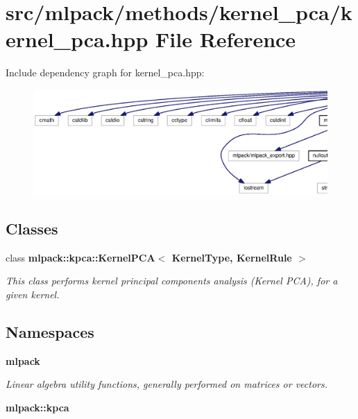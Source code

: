 \section{src/mlpack/methods/kernel\+\_\+pca/kernel\+\_\+pca.hpp File Reference}
\label{kernel__pca_8hpp}
Include dependency graph for kernel\+\_\+pca.\+hpp\+:
\nopagebreak
\begin{figure}[H]
\begin{center}
\leavevmode
\includegraphics[width=350pt]{kernel__pca_8hpp__incl}
\end{center}
\end{figure}
\subsection*{Classes}
\begin{DoxyCompactItemize}
\item 
class {\bf mlpack\+::kpca\+::\+Kernel\+P\+C\+A$<$ Kernel\+Type, Kernel\+Rule $>$}
\begin{DoxyCompactList}\small\item\em This class performs kernel principal components analysis (Kernel P\+CA), for a given kernel. \end{DoxyCompactList}\end{DoxyCompactItemize}
\subsection*{Namespaces}
\begin{DoxyCompactItemize}
\item 
 {\bf mlpack}
\begin{DoxyCompactList}\small\item\em Linear algebra utility functions, generally performed on matrices or vectors. \end{DoxyCompactList}\item 
 {\bf mlpack\+::kpca}
\end{DoxyCompactItemize}


